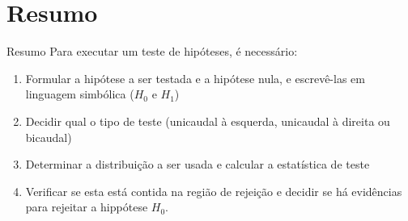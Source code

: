 \documentclass{beamer}
\begin{document}
\section{Resumo}

\begin{frame}{Resumo}
  Para executar um teste de hipóteses, é necessário:
  \begin{enumerate}
  \item Formular a hipótese a ser testada e a hipótese nula, e
    escrevê-las em linguagem simbólica ($H_0$ e $H_1$)
  \item Decidir qual o tipo de teste (unicaudal à esquerda, unicaudal
    à direita ou bicaudal)
  \item Determinar a distribuição a ser usada e calcular a estatística
    de teste
  \item Verificar se esta está contida na região de rejeição e decidir
    se há evidências para rejeitar a hippótese $H_0$.
  \end{enumerate}
\end{frame}
\end{document}
